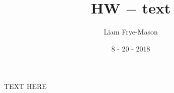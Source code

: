 \documentclass[notitlepage]{turabian-researchpaper}
\title{HW $-$ text}
\author{Liam Frye-Mason}
\date{8 - 20 - 2018}
\begin{document}
\maketitle
TEXT HERE

\end{document}
